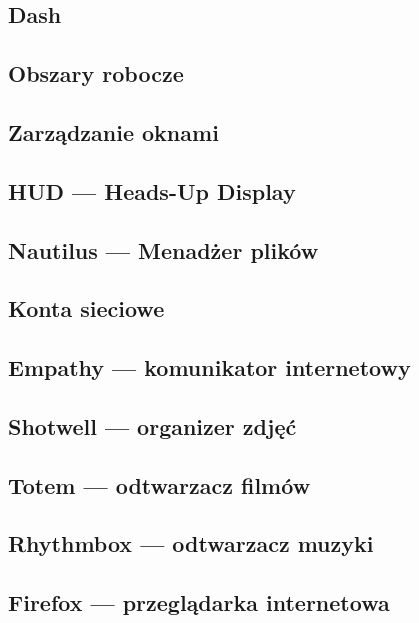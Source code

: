 \documentclass[a4paper,11pt,oneside]{mwart}
\begin{document}
		\subsection{Dash}
			
		\subsection{Obszary robocze}
			
		\subsection{Zarządzanie oknami}
			
		\subsection{HUD --- Heads-Up Display}
			
		\subsection{Nautilus --- Menadżer plików}
			
		\subsection{Konta sieciowe}
			
		\subsection{Empathy --- komunikator internetowy}
			
		\subsection{Shotwell --- organizer zdjęć}
			
		\subsection{Totem --- odtwarzacz filmów}
			
		\subsection{Rhythmbox --- odtwarzacz muzyki}
			
		\subsection{Firefox --- przeglądarka internetowa}
			
\end{document}
